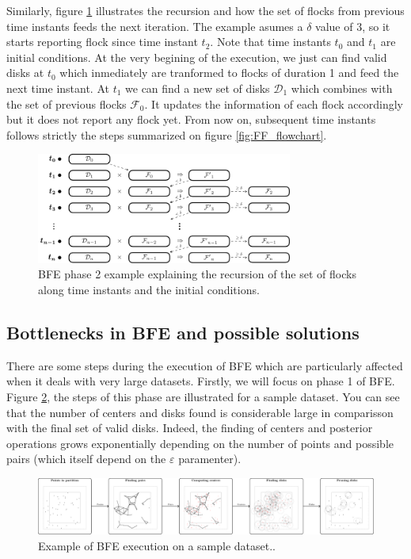 \documentclass[journal,onecolumn]{IEEEtran}
\begin{document}
Similarly, figure \ref{fig:FF_stages} illustrates the recursion and how the set of flocks from previous time instants feeds the next iteration.  The example asumes a $\delta$ value of 3, so it starts reporting flock since time instant $t_2$.  Note that time instants $t_0$ and $t_1$ are initial conditions.  At the very begining of the execution, we just can find valid disks at $t_0$ which inmediately are tranformed to flocks of duration 1 and feed the next time instant.  At $t_1$ we can find a new set of disks $\mathcal{D}_1$ which combines with the set of previous flocks $\mathcal{F}_0$.  It updates the information of each flock accordingly but it does not report any flock yet.  From now on, subsequent time instants follows strictly the steps summarized on figure \ref{fig:FF_flowchart}.

\begin{figure}[!ht]
    \centering
    \includegraphics[width=0.75\textwidth]{figures/FF_stages}
    \caption{BFE phase 2 example explaining the recursion of the set of flocks along time instants and the initial conditions.}\label{fig:FF_stages}
\end{figure}

\subsection{Bottlenecks in BFE and possible solutions}
There are some steps during the execution of BFE which are particularly affected when it deals with very large datasets.  Firstly, we will focus on phase 1 of BFE.  Figure \ref{fig:example}, the steps of this phase are illustrated for a sample dataset.  You can see that the number of centers and disks found is considerable large in comparisson with the final set of valid disks.  Indeed, the finding of centers and posterior operations grows exponentially depending on the number of points and possible pairs (which itself depend on the $\varepsilon$ paramenter).   

\begin{figure}[!ht]
    \centering
    \includegraphics[width=1\textwidth]{figures/MF_stages/flow}
    \caption{Example of BFE execution on a sample dataset..}\label{fig:example}
\end{figure}
\end{document}
